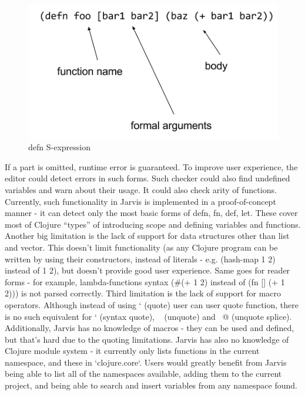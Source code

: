 \documentclass[11pt]{scrartcl}
\begin{document}
\begin{figure}[hbt]
  \includegraphics[scale=0.5]{img/sexp}
  \caption{defn S-expression}
  \label{sexp}
\end{figure}



If a part is omitted, runtime error is guaranteed. To improve user experience, the editor could detect errors in such forms. Such checker could also find undefined variables and warn about their usage. It could also check arity of functions. Currently, such functionality in Jarvis is implemented in a proof-of-concept manner - it can detect only the most basic forms of defn, fn, def, let. These cover most of Clojure “types” of introducing scope and defining variables and functions.
Another big limitation is the lack of support for data structures other than list and vector. This doesn’t limit functionality (as any Clojure program can be written by using their constructors, instead of literals - e.g. (hash-map 1 2) instead of {1 2}), but doesn’t provide good user experience. Same goes for reader forms - for example, lambda-functions syntax (\#(+ 1 2) instead of (fn [] (+ 1 2))) is not parsed correctly. Third limitation is the lack of support for macro operators. Although instead of using ‘ (quote) user can user quote function, there is no such equivalent for ` (syntax quote), ~ (unquote) and ~@ (unquote splice). Additionally, Jarvis has no knowledge of macros - they can be used and defined, but that’s hard due to the quoting limitations. Jarvis has also no knowledge of Clojure module system - it currently only lists functions in the current namespace, and these in `clojure.core`. Users would greatly benefit from Jarvis being able to list all of the namespaces available, adding them to the current project, and being able to search and insert variables from any namespace found.
\end{document}
